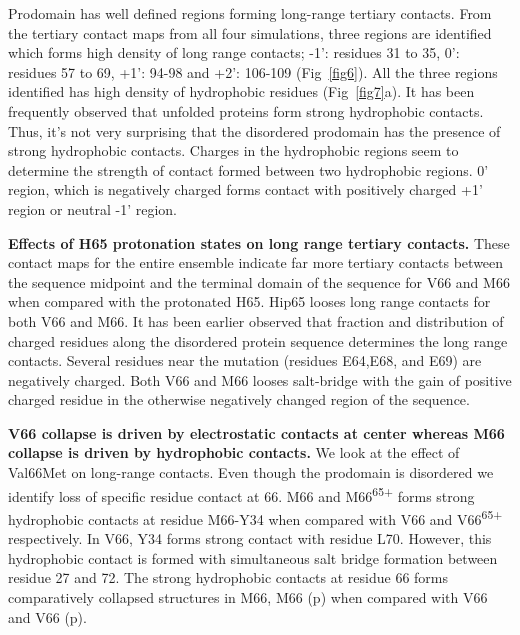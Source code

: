 \documentclass[10pt,letterpaper]{article}
\begin{document}
Prodomain has well defined regions forming long-range tertiary contacts. From the tertiary contact maps from all four simulations, three regions are identified which forms high density of long range contacts; -1': residues 31 to 35, 0': residues 57 to 69, +1':  94-98 and +2': 106-109 (Fig~\ref{fig6}). All the three regions identified has high density of hydrophobic residues (Fig~\ref{fig7}a). It has been frequently observed that unfolded proteins form strong hydrophobic contacts. Thus, it's not very surprising that the disordered prodomain has the presence of strong hydrophobic contacts. Charges in the hydrophobic regions seem to determine the strength of contact formed between two hydrophobic regions.  0' region, which is negatively charged forms contact with positively charged +1' region or neutral -1' region. 


\textbf{Effects of H65 protonation states on long range tertiary contacts.} These contact maps for the entire ensemble indicate far more tertiary contacts between the sequence midpoint and the terminal domain of the sequence for V66 and M66 when compared with the protonated H65. Hip65 looses long range contacts for both V66 and M66. It has been earlier observed that fraction and distribution of charged residues along the disordered protein sequence determines the long range contacts. Several residues near the mutation (residues E64,E68, and E69) are negatively charged. Both V66 and M66 looses salt-bridge with the gain of positive charged residue in the otherwise negatively changed region of the sequence. 

\textbf{V66 collapse is driven by electrostatic contacts at center whereas M66 collapse is driven by hydrophobic contacts.} We look at the effect of Val66Met on long-range contacts. Even though the prodomain is disordered we identify loss of specific residue contact at 66. M66 and M66\textsuperscript{65+} forms strong hydrophobic contacts at residue M66-Y34 when compared with V66 and V66\textsuperscript{65+} respectively.  
In V66, Y34 forms strong contact with residue L70. However, this hydrophobic contact is formed with simultaneous salt bridge formation between residue 27 and 72. 
The strong hydrophobic contacts at residue 66 forms comparatively collapsed structures in M66, M66 (p) when compared with V66 and V66 (p). 



\end{document}
